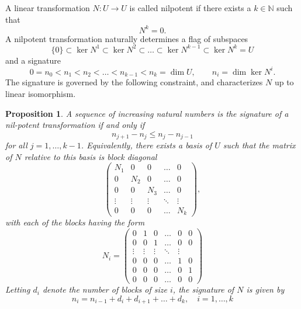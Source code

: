\documentclass{article}
\newtheorem{proposition}{Proposition}
\begin{document}
A linear transformation $N: U\rightarrow U$ is called nilpotent if there exists a $k\in\mathbb{N}$ such that 
$$N^k = 0.$$
A nilpotent transformation naturally determines a flag of subspaces
$$ \{0\} \subset \ker N^1 \subset \ker N^2 \subset \ldots \subset \ker N^{k-1} \subset \ker N^k = U$$
and a signature
$$0  = n_0 < n_1 < n_2 < \ldots < n_{k-1} < n_k = \dim U,\qquad n_i =
\dim \ker N^i.$$
The signature is governed by the following constraint, and
characterizes $N$ up to linear isomorphism.
\begin{proposition}
A sequence of increasing natural numbers is the signature of a nil-potent transformation if and only if
$$n_{j+1} - n_{j} \leq n_{j} - n_{j-1}$$
for all $j=1,\ldots,k-1$.  Equivalently, there exists a basis of $U$
such that the matrix of $N$ relative to this basis is block diagonal
$$\begin{pmatrix}
N_1 & 0 & 0 & \ldots & 0\\
0 & N_2 & 0 & \ldots & 0 \\
0 & 0 & N_3 & \ldots & 0 \\
\vdots & \vdots & \vdots & \ddots & \vdots \\
0 & 0 & 0 & \ldots & N_k
\end{pmatrix},$$
with each of the blocks having the form
$$
N_i = \begin{pmatrix}
  0 & 1 & 0 & \ldots & 0 & 0 \\
  0 & 0 & 1 & \ldots & 0 & 0 \\
  \vdots & \vdots & \vdots & \ddots & \vdots \\
  0 & 0 & 0 & \ldots & 1 & 0 \\
  0 & 0 & 0 & \ldots & 0 & 1 \\
  0 & 0 & 0 & \ldots & 0 & 0   
\end{pmatrix}
$$
Letting $d_i$ denote the number of blocks of size $i$, the
signature of $N$ is given by
$$n_i = n_{i-1} + d_i + d_{i+1} + \ldots + d_k,\quad i=1,\ldots,k$$
\end{proposition}
\end{document}
